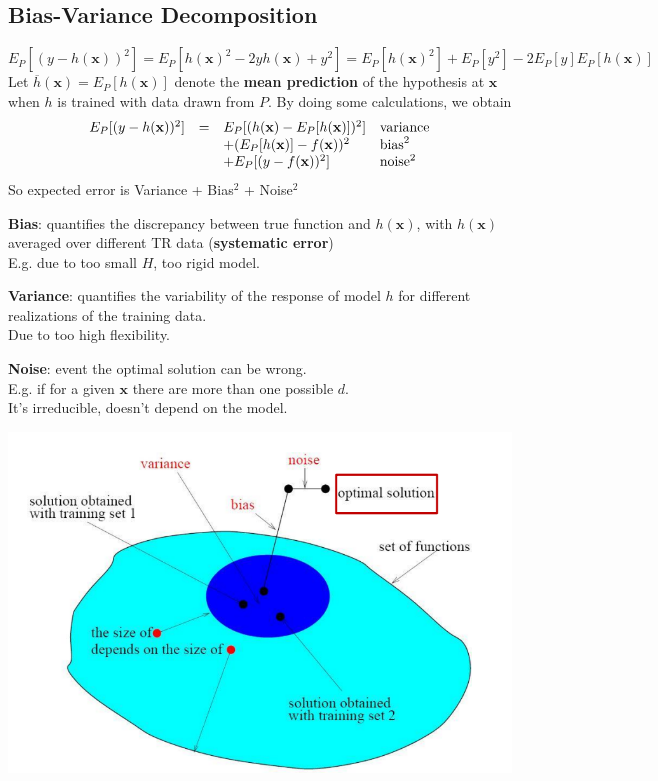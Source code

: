 \documentclass[10pt]{report}
\begin{document}
\subsection{Bias-Variance Decomposition}
$$E_P[(y - h(\mathbf{x}))^2] = E_P[h(\mathbf{x})^2 - 2yh(\mathbf{x}) + y^2] = E_P[h(\mathbf{x})^2] + E_P[y^2] - 2E_P[y]E_P[h(\mathbf{x})]$$
Let $\overline{h}(\mathbf{x}) = E_P[h(\mathbf{x})]$ denote the \textbf{mean prediction} of the hypothesis at $\mathbf{x}$ when $h$ is trained with data drawn from $P$. By doing some calculations, we obtain $$\begin{array}{r c l l}
E_P[(y-h(\mathbf{x}))^2] & = & E_P[(h(\mathbf{x}) - E_P[h(\mathbf{x})])^2] & \text{variance}\\
 & & + (E_P[h(\mathbf{x})] - f(\mathbf{x}))^2 & \text{bias}^2 \\
 & & + E_P[(y - f(\mathbf{x}))^2] & \text{noise}^2
\end{array}$$
So expected error is Variance + Bias$^2$ + Noise$^2$\begin{list}{}{}
	\item \textbf{Bias}: quantifies the discrepancy between true function and $h(\mathbf{x})$, with $h(\mathbf{x})$ averaged over different TR data (\textbf{systematic error})\\E.g. due to too small $H$, too rigid model.
	\item \textbf{Variance}: quantifies the variability of the response of model $h$ for different realizations of the training data.\\Due to too high flexibility.
	\item \textbf{Noise}: event the optimal solution can be wrong.\\E.g. if for a given $\mathbf{x}$ there are more than one possible $d$.\\
	It's irreducible, doesn't depend on the model.
\end{list}
\begin{center}
	\includegraphics[scale=0.5]{24.png}
\end{center}
\end{document}

